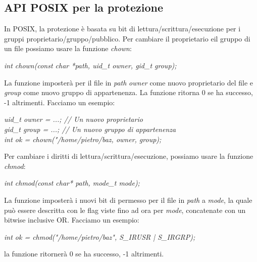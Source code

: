 \documentclass[12pt]{article}
\begin{document}
\subsection{API POSIX per la protezione}
In POSIX, la protezione è basata su bit di lettura/scrittura/esecuzione per i gruppi proprietario/gruppo/pubblico.
Per cambiare il proprietario eil gruppo di un file possiamo usare la funzione \textit{chown}:
\begin{center}
    \textit{int chown(const char *path, uid\_t owner, gid\_t group);}
\end{center}
La funzione imposterà per il file in \textit{path} \textit{owner} come nuovo proprietario del file e \textit{group} come nuovo gruppo di appartenenza.
La funzione ritorna 0 se ha successo, -1 altrimenti.
Facciamo un esempio:
\begin{center}
    \textit{uid\_t owner = ...; // Un nuovo proprietario} \\
    \textit{gid\_t group = ...; // Un nuovo gruppo di appartenenza} \\
    \textit{int ok = chown("/home/pietro/baz, owner, group);}
\end{center}
Per cambiare i diritti di lettura/scrittura/esecuzione, possiamo usare la funzione \textit{chmod}:
\begin{center}
    \textit{int chmod(const char* path, mode\_t mode);}
\end{center}
La funzione imposterà i nuovi bit di permesso per il file in \textit{path} a \textit{mode}, la quale può essere
descritta con le flag viste fino ad ora per \textit{mode}, concatenate con un bitwise inclusive OR. Facciamo un esempio:
\begin{center}
    \textit{int ok = chmod("/home/pietro/baz", S\_IRUSR | S\_IRGRP);}
\end{center}
la funzione ritornerà 0 se ha successo, -1 altrimenti.
\end{document}
